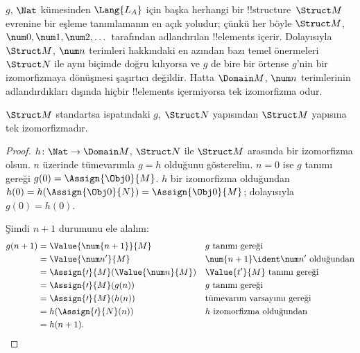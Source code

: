 \documentclass[../../../include/open-logic-section]{subfiles}
\begin{document}
\begin{explain}
$g$, $\Nat$ kümesinden $\Lang{L_A}$ için başka herhangi bir
!!{structure}~$\Struct M$ evrenine bir eşleme tanımlamanın en açık
yoludur; çünkü her böyle $\Struct M$, $\num0,\num1,\num2,\dots$
tarafından adlandırılan !!{element}s içerir. Dolayısıyla $\Struct M$,
$\num n$ terimleri hakkındaki en azından bazı temel önermeleri
$\Struct N$ ile aynı biçimde doğru kılıyorsa ve $g$ de bire bir örtense
$g$'nin bir izomorfizmaya dönüşmesi şaşırtıcı değildir. Hatta
$\Domain M$, $\num n$ terimlerinin adlandırdıkları dışında hiçbir
!!{element}s içermiyorsa tek izomorfizma odur.
\end{explain}

\begin{prop}
 $\Struct M$ standartsa
 ispatındaki $g$, $\Struct N$ yapısından
$\Struct M$ yapısına tek izomorfizmadır.
\end{prop}

\begin{proof}
$h\colon\Nat\to\Domain M$, $\Struct N$ ile $\Struct M$ arasında bir
izomorfizma olsun. $n$ üzerinde tümevarımla $g=h$ olduğunu gösterelim.
$n=0$ ise $g$ tanımı gereği $g(0)=\Assign{\Obj0}{M}$. $h$ bir
izomorfizma olduğundan
$h(0)=h(\Assign{\Obj0}{N})=\Assign{\Obj0}{M}$; dolayısıyla
$g(0)=h(0)$.

Şimdi $n+1$ durumunu ele alalım:
\begin{align*}
  g(n+1) & = \Value{\num{n+1}}{M} && \text{$g$ tanımı gereği}\\
  & = \Value{\num n'}{M} && \text{$\num{n+1}\ident\num n'$ olduğundan}\\
  & = \Assign{\prime}{M}(\Value{\num n}{M})
    && \text{$\Value{t'}{M}$ tanımı gereği}\\
  & = \Assign{\prime}{M}(g(n)) && \text{$g$ tanımı gereği}\\
  & = \Assign{\prime}{M}(h(n)) && \text{tümevarım varsayımı gereği}\\
  & = h(\Assign{\prime}{N}(n)) && \text{$h$ izomorfizma olduğundan}\\
  & = h(n+1).
\end{align*}
\end{proof}
\end{document}
